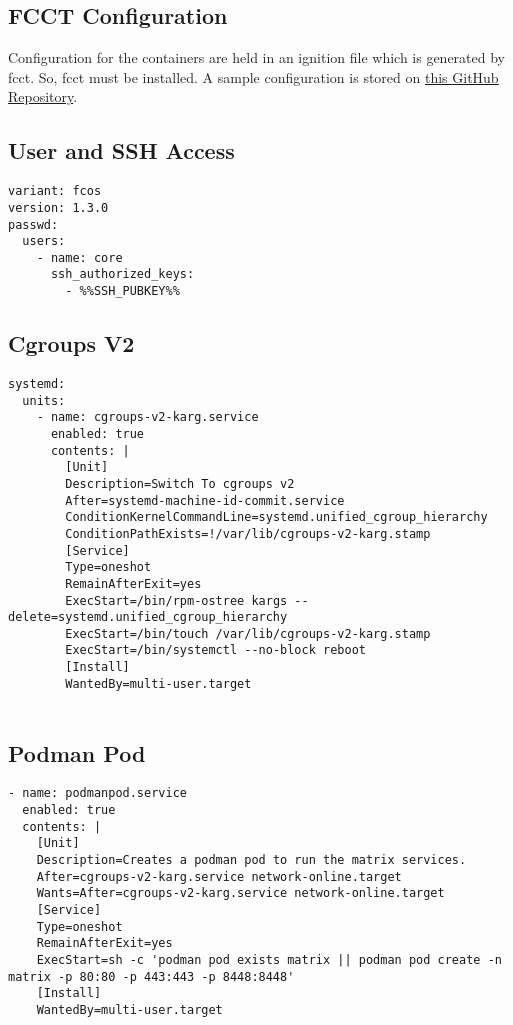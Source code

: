 \documentclass{article}
\begin{document}
\subsection{FCCT Configuration}
Configuration for the containers are held in an ignition file which is generated by fcct. So, fcct must be installed. A sample configuration is stored on \href{https://github.com/travier/fedora-coreos-matrix}{this GitHub Repository}. 

\subsection{User and SSH Access}
\begin{lstlisting}
variant: fcos                     
version: 1.3.0       
passwd:           
  users:      
    - name: core           
      ssh_authorized_keys:       
        - %%SSH_PUBKEY%%
\end{lstlisting}

\subsection{Cgroups V2}
\begin{verbatim}
systemd:                   
  units:        
    - name: cgroups-v2-karg.service               
      enabled: true       
      contents: |       
        [Unit]       
        Description=Switch To cgroups v2                           
        After=systemd-machine-id-commit.service
        ConditionKernelCommandLine=systemd.unified_cgroup_hierarchy       
        ConditionPathExists=!/var/lib/cgroups-v2-karg.stamp       
        [Service]       
        Type=oneshot       
        RemainAfterExit=yes       
        ExecStart=/bin/rpm-ostree kargs --delete=systemd.unified_cgroup_hierarchy       
        ExecStart=/bin/touch /var/lib/cgroups-v2-karg.stamp       
        ExecStart=/bin/systemctl --no-block reboot       
        [Install]                       
        WantedBy=multi-user.target       
                
\end{verbatim}

\subsection{Podman Pod}
\begin{lstlisting}
- name: podmanpod.service       
  enabled: true       
  contents: |       
    [Unit]       
    Description=Creates a podman pod to run the matrix services.       
    After=cgroups-v2-karg.service network-online.target       
    Wants=After=cgroups-v2-karg.service network-online.target       
    [Service]       
    Type=oneshot       
    RemainAfterExit=yes       
    ExecStart=sh -c 'podman pod exists matrix || podman pod create -n matrix -p 80:80 -p 443:443 -p 8448:8448'       
    [Install]       
    WantedBy=multi-user.target
\end{lstlisting}
\end{document}
